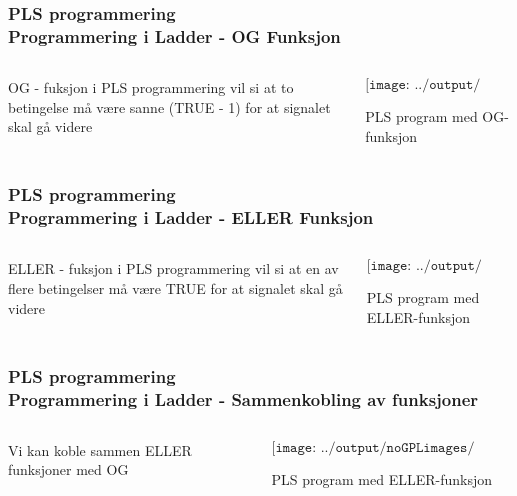 \documentclass[aspectratio=169,xcolor=dvipsnames]{beamer}
\begin{document}
\begin{frame}
	\frametitle{PLS programmering \\ Programmering i Ladder - OG Funksjon}
	\begin{columns}
		\begin{column}{0.3\textwidth}
			OG - fuksjon i PLS programmering vil si at to betingelse må være sanne (TRUE - 1) for at signalet skal gå videre

			
		\end{column}

		\begin{column}{0.7\textwidth}
	$$\texttt{[image: ../output/noGPLimages/pTIFPLCx05.png]}$$
	\begin{center}
	PLS program med OG-funksjon
	\end{center}
		\end{column}
	\end{columns}
\end{frame}
\begin{frame}
	\frametitle{PLS programmering \\ Programmering i Ladder - ELLER Funksjon}
	\begin{columns}
		\begin{column}{0.3\textwidth}
			ELLER - fuksjon i PLS programmering vil si at en av flere betingelser må være TRUE for at signalet skal gå videre

			
		\end{column}

		\begin{column}{0.7\textwidth}
	$$\texttt{[image: ../output/noGPLimages/pTIFPLCx06.png]}$$
	\begin{center}
	PLS program med ELLER-funksjon
	\end{center}
		\end{column}
	\end{columns}
\end{frame}
\begin{frame}
	\frametitle{PLS programmering \\ Programmering i Ladder - Sammenkobling av funksjoner }
	\begin{columns}
		\begin{column}{0.3\textwidth}
	Vi kan koble sammen ELLER funksjoner med OG
			
		\end{column}

		\begin{column}{0.7\textwidth}
	$$\texttt{[image: ../output/noGPLimages/pTIFPLCx07.png]}$$
	\begin{center}
	PLS program med ELLER-funksjon
	\end{center}
		\end{column}
	\end{columns}
\end{frame}
\end{document}
